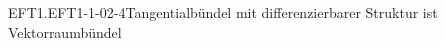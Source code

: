 \begin{EXA}{EFT1.EFT1-1-02-4}{Tangentialbündel mit differenzierbarer Struktur ist Vektorraumbündel}

\end{EXA}
